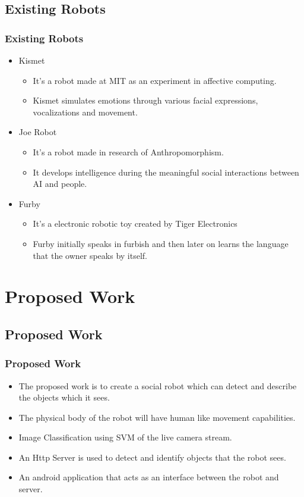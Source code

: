 \documentclass{beamer}
\begin{document}
\subsection{Existing Robots}
\begin{frame}
	\frametitle{Existing Robots}
	\begin{itemize}
		\item Kismet
			\begin{itemize}
				\item It's a robot made at MIT as an experiment in affective computing.
				\item Kismet simulates emotions through various facial expressions, vocalizations and movement.
			\end{itemize}
		\item Joe Robot
			\begin{itemize}
				\item It's a robot made in research of Anthropomorphism.
				\item It develops intelligence during the meaningful social interactions between AI and people.
			\end{itemize}
		\item Furby
			\begin{itemize}
				\item It's a electronic robotic toy created by Tiger Electronics
				\item Furby initially speaks in furbish and then later on learns the language that the owner speaks by itself.
			\end{itemize}
	\end{itemize}
\end{frame}

\section{Proposed Work}
\subsection{Proposed Work}
\begin{frame}
	\frametitle{Proposed Work}
	\begin{itemize}
		\item The proposed work is to create a social robot which can detect and describe the objects which it sees.
		\item The physical body of the robot will have human like movement capabilities.
		\item Image Classification using SVM of the live camera stream.
		\item An Http Server is used to detect and identify objects that the robot sees.
		\item An android application that acts as an interface between the robot and server.
	\end{itemize}
\end{frame}
\end{document}
